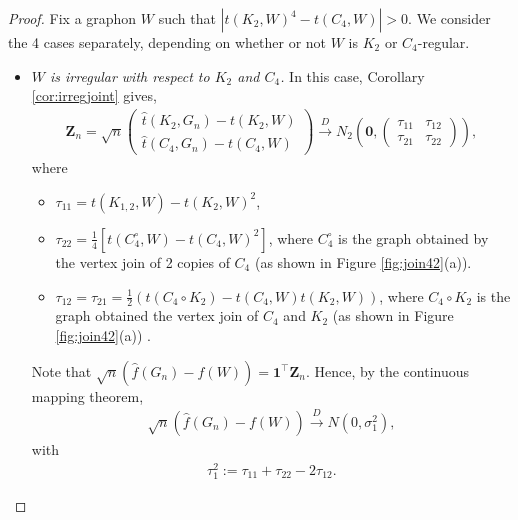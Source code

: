 \documentclass[11pt,reqno]{amsart}
\numberwithin{equation}{section}
\newcommand\dto{\overset{D}{\rightarrow}}
\theoremstyle{definition}
\begin{document}
\begin{proof} 
Fix a graphon $W$ such that $|t(K_{2},W)^{4} - t(C_{4},W)|>0$.  We consider the 4 cases separately, depending on whether or not $W$ is $K_2$ or $C_4$-regular. 
 
\begin{itemize}

\item[{\it Case} 1:] {\it $W$ is irregular with respect to $K_{2}$ and $C_{4}$.} In this case, Corollary \ref{cor:irregjoint} gives, 
\begin{align*}
    \bm Z_{n} = \sqrt{n}
    \begin{pmatrix}
    \hat{t}(K_{2}, G_n) - t(K_{2},W)\\
    \hat{t}(C_{4}, G_n) - t(C_{4},W)
    \end{pmatrix}
    \overset{D}{\rightarrow}
    N_2\left(\bm{0}, \begin{pmatrix}
       \tau_{11} & \tau_{12}\\
        \tau_{21} & \tau_{22}
    \end{pmatrix} \right) , 
    \end{align*}
where 
\begin{itemize}

\item $\tau_{11} = t(K_{1, 2},W) - t(K_{2},W)^{2}$,

\item  $\tau_{22} = \frac{1}{4}\left[t\left(C_{4}^\circ,W\right) - t(C_{4},W)^{2}\right]$, where $C_{4}^\circ$ is the graph obtained by the vertex join of 2 copies of $C_4$ (as shown in Figure \ref{fig:join42}(a)).

\item $\tau_{12} = \tau_{21} = \frac{1}{2}\left(t(C_{4} \circ K_{2}) - t(C_{4},W)t(K_{2},W)\right)$, where $C_{4} \circ K_{2}$ is the graph obtained the vertex join of $C_4$ and $K_2$ (as shown in Figure \ref{fig:join42}(a)) . 
\end{itemize}
Note that $\sqrt{n}(\hat f(G_n) - f(W)) = \bm{1}^\top \bm Z_{n}$. Hence, by the continuous mapping theorem, 
\begin{align*}
    \sqrt{n}(\hat f(G_n) - f(W))\dto N\left(0,\sigma_{1}^2\right) , 
\end{align*}
with 
\begin{align}\label{eq:varianceirregular}
    \tau_1^2 := \tau_{11} + \tau_{22} - 2 \tau_{12}.
\end{align} 



\end{itemize}
\end{proof}
\end{document}

